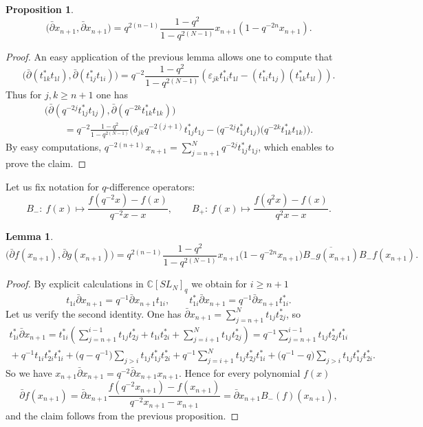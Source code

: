\documentclass[11pt]{article}
\newtheorem{lemma}{Lemma}
\newtheorem{proposition}{Proposition}
\begin{document}
\begin{proposition}
\[
\big(\bar \partial x_{n+1}, \bar \partial x_{n+1}\big)= q^{2(n-1)} \frac{1-q^2}{1-q^{2(N-1)}}
x_{n+1}(1-q^{-2n}x_{n+1}).
\]
\end{proposition}

\begin{proof} An easy application of the previous lemma allows one to compute that
\[
\big(\bar \partial (t_{1k}^*t_{1l}), \bar \partial
(t_{1j}^*t_{1i})\big)=q^{-2}\frac{1-q^2}{1-q^{2(N-1)}}(\varepsilon_{jk}t_{1i}^*t_{1l}-(t_{1i}^*t_{1j})(t_{1k}^*t_{1l})).
\]
Thus for $j,k \geq n+1$ one has
\begin{gather*}
\big(\bar \partial (q^{-2j}t_{1j}^*t_{1j}), \bar \partial
(q^{-2k}t_{1k}^*t_{1k})\big)\\
\qquad{} =q^{-2}\frac{1-q^2}{1-q^{2(N-1)}}\big(\delta_{jk}q^{-2(j+1)}t_{1j}^*t_{1j}
-\big(q^{-2j}t_{1j}^*t_{1j}\big)\big(q^{-2k}t_{1k}^*t_{1k}\big)\big).
\end{gather*}
By easy computations, $q^{-2(n+1)}x_{n+1}=\sum\limits_{j=n+1}^N q^{-2j}t_{1j}^*t_{1j}$, which enables to prove the
claim.
\end{proof}

Let us f\/ix notation for $q$-dif\/ference operators:
\[
B_-: \ f(x) \mapsto \frac{f(q^{-2}x)-f(x)}{q^{-2}x-x}, \qquad B_+: \ f(x) \mapsto \frac{f(q^2x)-f(x)}{q^2x-x}.
\]
\begin{lemma}\label{lem_dbar}
\[
\big(\bar \partial f(x_{n+1}), \bar \partial g(x_{n+1})\big)= q^{2(n-1)} \frac{1-q^2}{1-q^{2(N-1)}} x_{n+1}
\big(1-q^{-2n}x_{n+1}\big) \overline{B_-g(x_{n+1})} B_-f(x_{n+1}).
\]
\end{lemma}
\begin{proof} By explicit calculations in $\mathbb C[SL_N]_q$ we obtain for $i \geq n+1$
\[
t_{1i}\bar \partial x_{n+1}= q^{-1} \bar \partial x_{n+1} t_{1i}, \qquad t_{1i}^* \bar \partial
x_{n+1}=q^{-1} \bar
\partial x_{n+1} t_{1i}^*.
\]
Let us verify the second identity. One has $\bar \partial x_{n+1}=\sum\limits_{j=n+1}^Nt_{1j}t_{2j}^*$, so
\begin{gather*}
t_{1i}^*\bar \partial x_{n+1}=t_{1i}^*  \left(\sum_{j=n+1}^{i-1}
t_{1j}t_{2j}^*+t_{1i}t_{2i}^*+\sum_{j=i+1}^Nt_{1j}t_{2j}^*\right) = q^{-1} \sum_{j=n+1}^{i-1}t_{1j}t_{2j}^*
  t_{1i}^*
\\
{}
+q^{-1}t_{1i}t_{2i}^*t_{1i}^*+\big(q-q^{-1}\big)\sum_{j>i}t_{1j}t_{1j}^*t_{2i}^*+q^{-1}\sum_{j=i+1}^N
t_{1j}t_{2j}^*t_{1i}^*+\big(q^{-1}-q\big)\sum_{j>i}t_{1j}t_{1j}^*t_{2i}^*.
\end{gather*}
So we have $x_{n+1}\bar \partial x_{n+1}=q^{-2} \bar
\partial x_{n+1} x_{n+1}$. Hence for every polynomial $f(x)$
\[
\bar \partial f(x_{n+1})=\bar \partial x_{n+1}\frac{f(q^{-2}x_{n+1})-f(x_{n+1})}{q^{-2}x_{n+1}-x_{n+1}}=\bar
\partial x_{n+1} B_-(f)(x_{n+1}),
\]
and  the claim follows from the previous proposition. \end{proof}
\end{document}
